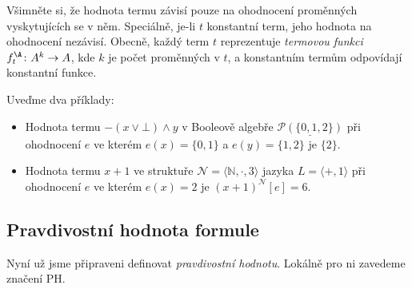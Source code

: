 \begin{remark}
    Všimněte si, že hodnota termu závisí pouze na ohodnocení proměnných vyskytujících se v něm. Speciálně, je-li $t$ konstantní term, jeho hodnota na ohodnocení nezávisí.
    Obecně, každý term $t$ reprezentuje \emph{termovou funkci} $f_t^\A\colon A^k\to A$, kde $k$ je počet proměnných v $t$, a konstantním termům odpovídají konstantní funkce.
\end{remark}

\begin{example}
    Uveďme dva příklady:
    \begin{itemize}
        \item Hodnota termu $-(x\lor \bot)\land y$ v Booleově algebře $\underline{\mathcal P(\{0,1,2\})}$ při ohodnocení $e$ ve kterém $e(x)=\{0,1\}$ a $e(y)=\{1,2\}$ je $\{2\}$.
        \item Hodnota termu $x+1$ ve struktuře $\mathcal N=\langle\mathbb N,\cdot,3\rangle$ jazyka $L=\langle +,1\rangle$ při ohodnocení $e$ ve kterém $e(x)=2$ je $(x+1)^\mathcal N[e]=6$.
    \end{itemize}
\end{example}


\subsection{Pravdivostní hodnota formule}\label{subsection:truth-value-of-formula}

Nyní už jsme připraveni definovat \emph{pravdivostní hodnotu}. Lokálně pro ni zavedeme značení $\mathrm{PH}$.

